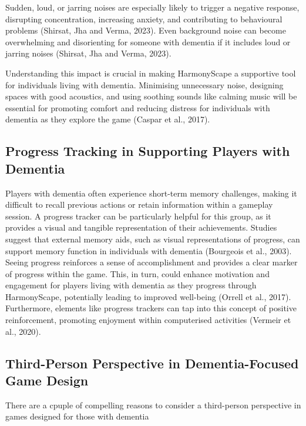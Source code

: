\documentclass{l4proj}
\begin{document}
Sudden, loud, or jarring noises are especially likely to trigger a negative response, disrupting concentration, increasing anxiety, and contributing to behavioural problems (Shirsat, Jha and Verma, 2023). Even background noise can become overwhelming and disorienting for someone with dementia if it includes loud or jarring noises (Shirsat, Jha and Verma, 2023).

Understanding this impact is crucial in making HarmonyScape a supportive tool for individuals living with dementia. Minimising unnecessary noise, designing spaces with good acoustics, and using soothing sounds like calming music will be essential for promoting comfort and reducing distress for individuals with dementia as they explore the game (Caspar et al., 2017).

\subsection{Progress Tracking in Supporting Players with Dementia}\label{sec:progress_tracking}
Players with dementia often experience short-term memory challenges, making it difficult to recall previous actions or retain  information within a gameplay session. A progress tracker can be particularly helpful for this group, as it provides a visual and tangible representation of their achievements. Studies suggest that external memory aids, such as visual representations of progress, can support memory function in individuals with dementia (Bourgeois et al., 2003). Seeing progress reinforces a sense of accomplishment and  provides a clear marker of progress within the game. This, in turn, could enhance motivation and engagement for players living with dementia as they progress through HarmonyScape, potentially leading to improved well-being (Orrell et al., 2017). Furthermore, elements like progress trackers can tap into this concept of positive reinforcement, promoting enjoyment within computerised activities (Vermeir et al., 2020).

\subsection{Third-Person Perspective in Dementia-Focused Game Design}\label{sec:third_person}
There are a cpuple of compelling reasons to consider a third-person perspective in games designed for those with dementia
\end{document}
